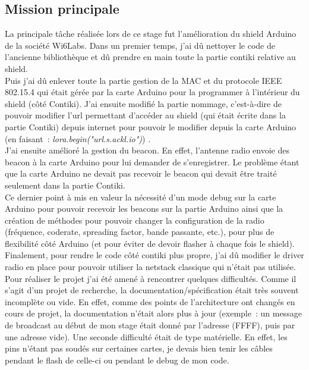 \documentclass{article}
\begin{document}
\subsection{Mission principale}
La principale tâche réalisée lors de ce stage fut l'amélioration du shield Arduino de la société Wi6Labs. 
Dans un premier temps, j'ai dû nettoyer le code de l'ancienne bibliothèque et dû prendre en main toute la partie contiki relative au shield.\\
Puis j'ai dû enlever toute la partie gestion de la MAC et du protocole IEEE 802.15.4 %
qui était gérée par la carte Arduino pour la programmer à l'intérieur du shield (côté Contiki). J'ai ensuite modifié la partie nommage, c'est-à-dire de pouvoir modifier l'url permettant d'accéder au shield (qui était écrite dans la partie Contiki) depuis internet pour pouvoir le modifier depuis la carte Arduino (en faisant~: \emph{lora.begin("url.s.ackl.io")}) %
.\\
J'ai ensuite amélioré la gestion du beacon. En effet, l'antenne radio envoie des beacon à la carte Arduino pour lui demander de s'enregistrer. Le problème étant que la carte Arduino ne devait pas recevoir le beacon qui devait être traité seulement dans la partie Contiki.\\
Ce dernier point à mis en valeur la nécessité d'un mode debug sur la carte Arduino pour pouvoir recevoir les beacons sur la partie Arduino ainsi que la création de méthodes pour pouvoir changer la configuration de la radio (fréquence, coderate, spreading factor, bande passante, etc.), pour plus de flexibilité côté Arduino (et pour éviter de devoir flasher à chaque fois le shield).\\
Finalement, pour rendre le code côté contiki plus propre, j'ai dû modifier le driver radio en place pour pouvoir utiliser la netstack classique %
qui n'était pas utilisée.\\
Pour réaliser le projet j'ai été amené à rencontrer quelques difficultés. Comme il s'agit d'un projet de recherche, la documentation/spécification était très souvent incomplète ou vide. En effet, comme des points de l'architecture ont changés en cours de projet, la documentation n'était alors plus à jour (exemple~: un message de broadcast au début de mon stage était donné par l'adresse (FFFF), puis par une adresse vide). Une seconde difficulté était de type matérielle. En effet, les pins n'étant pas soudés sur certaines cartes, je devais bien tenir les câbles pendant le flash de celle-ci ou pendant le debug de mon code.\\
\end{document}

